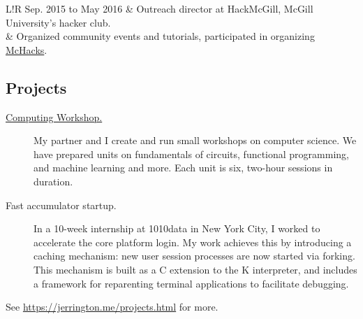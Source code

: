 \documentclass{article}
\newcommand\VRule{\color{lightgray}\vrule width 0.5pt}
\begin{document}
\begin{tabular}[h]{L!{\VRule}R}
  Sep. 2015 to May 2016
    & Outreach director at HackMcGill, McGill University's hacker club. \\
    & Organized community events and tutorials,
      participated in organizing \href{http://mchacks.io/}{McHacks}.
\end{tabular}

\subsection*{Projects}

\begin{description}
  \item[\href{https://computing-workshop.com/}{Computing Workshop.}]
    My partner and I create and run small workshops on computer science.
    We have prepared units on fundamentals of circuits, functional
    programming, and machine learning and more. Each unit is six, two-hour
    sessions in duration.
    
  \item[Fast accumulator startup.]
    In a 10-week internship at 1010data in New York City, I worked to
    accelerate the core platform login.
    My work achieves this by introducing a caching mechanism:
    new user session processes are now started via forking.
    This mechanism is built as a C extension to the K interpreter, and includes
    a framework for reparenting terminal applications to facilitate debugging.


\end{description}

See \url{https://jerrington.me/projects.html} for more.
\end{document}

